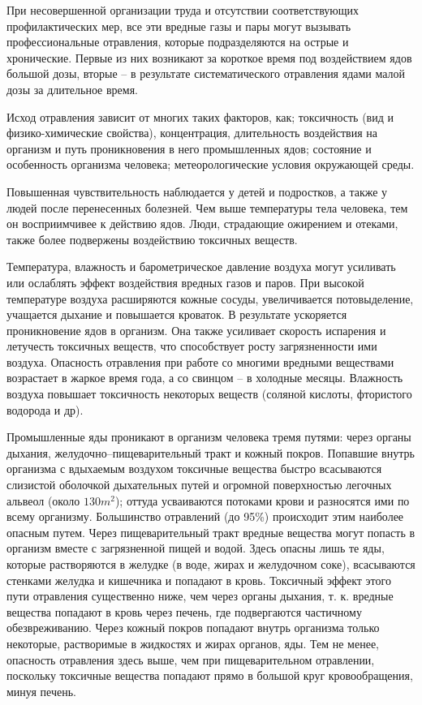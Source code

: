 \documentclass[a5paper, 12dd, twoside]{article}
\begin{document}
При несовершенной организации труда и отсутствии соответствующих профилактических мер, все эти вредные газы и пары могут вызывать профессиональные отравления, которые подразделяются на острые и хронические. Первые из них возникают за короткое время под воздействием ядов большой дозы, вторые -- в результате систематического отравления ядами малой дозы за длительное время.

Исход отравления зависит от многих таких факторов, как; токсичность (вид и физико-химические свойства), концентрация, длительность воздействия на организм и путь проникновения в него промышленных ядов; состояние и особенность организма человека; метеорологические условия окружающей среды.

Повышенная чувствительность наблюдается у детей и подростков, а также у людей после перенесенных болезней. Чем выше температуры тела человека, тем он восприимчивее к действию ядов. Люди, страдающие ожирением и отеками, также более подвержены воздействию токсичных веществ.

Температура, влажность и барометрическое давление воздуха могут усиливать или ослаблять эффект воздействия вредных газов и паров. При высокой температуре воздуха расширяются кожные сосуды, увеличивается потовыделение, учащается дыхание и повышается кроваток. В результате ускоряется проникновение ядов в организм. Она также усиливает скорость испарения и летучесть токсичных веществ, что способствует росту загрязненности ими воздуха. Опасность отравления при работе со многими вредными веществами возрастает в жаркое время года, а со свинцом -- в холодные месяцы. Влажность воздуха повышает токсичность некоторых веществ (соляной кислоты, фтористого водорода и др).

Промышленные яды проникают в организм человека тремя путями: через органы дыхания, желудочно--пищеварительный тракт и кожный покров. Попавшие внутрь организма с вдыхаемым воздухом токсичные вещества быстро всасываются слизистой оболочкой дыхательных путей и огромной поверхностью легочных альвеол (около \(130 m^2\)); оттуда усваиваются потоками крови и разносятся ими по всему организму. Большинство отравлений (до 95\%) происходит этим наиболее опасным путем. Через пищеварительный тракт вредные вещества могут попасть в организм вместе с загрязненной пищей и водой. Здесь опасны лишь те яды, которые растворяются в желудке (в воде, жирах и желудочном соке), всасываются стенками желудка и кишечника и попадают в кровь. Токсичный эффект этого пути отравления существенно ниже, чем через органы дыхания, т. к. вредные вещества попадают в кровь через печень, где подвергаются частичному обезвреживанию. Через кожный покров попадают внутрь организма только некоторые, растворимые в жидкостях и жирах органов, яды. Тем не менее, опасность отравления здесь выше, чем при пищеварительном отравлении, поскольку токсичные вещества попадают прямо в большой круг кровообращения, минуя печень.
\end{document}
